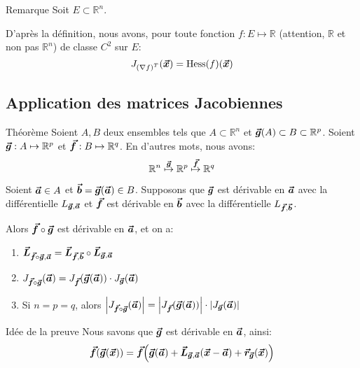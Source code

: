 \documentclass[a4paper]{article}
\begin{document}
\begin{parag}{Remarque}
    Soit $E \subset \mathbb{R}^n$.

    D'après la définition, nous avons, pour toute fonction $f: E \mapsto \mathbb{R}$ (attention, $\mathbb{R}$ et non pas $\mathbb{R}^n$) de classe $C^2$ sur $E$: 
    \[J_{\left(\nabla f\right)^T}\left(\bvec{x}\right) = \Hess\left(f\right)\left(\bvec{x}\right)\]
\end{parag}

\subsection{Application des matrices Jacobiennes}
\begin{parag}{Théorème}
    Soient $A, B$ deux ensembles tels que $A \subset \mathbb{R}^n$ et $\bvec{g}\left(A\right) \subset B \subset \mathbb{R}^p$. Soient $\bm{\protect\vec{g}}: A \mapsto \mathbb{R}^p$ et $\bm{\protect\vec{f}} : B \mapsto \mathbb{R}^q$. En d'autres mots, nous avons: 
    \[\mathbb{R}^n \overset{\text{$\bm{\protect\vec{g}}$}}{\mapsto} \mathbb{R}^p \overset{\text{$\bm{\protect\vec{f}}$}}{\mapsto} \mathbb{R}^q\]
    
    Soient $\bm{\protect\vec{a}} \in A$ et $\bvec{b} = \bvec{g}\left(\bvec{a}\right) \in B$. Supposons que $\bm{\protect\vec{g}}$ est dérivable en $\bm{\protect\vec{a}}$ avec la différentielle $L_{\bm{\protect\vec{g}}, \bm{\protect\vec{a}}}$ et $\bm{\protect\vec{f}}$ est dérivable en $\bm{\protect\vec{b}}$ avec la différentielle $L_{\bm{\protect\vec{f}}, \bm{\protect\vec{b}}}$.

    \vspace{1em}

    Alors $\bm{\protect\vec{f}} \circ \bm{\protect\vec{g}}$ est dérivable en $\bm{\protect\vec{a}}$, et on a:
    \begin{enumerate}
        \item $\displaystyle \bm{\protect\vec{L}}_{\bm{\protect\vec{f}} \circ \bm{\protect\vec{g}}, \bm{\protect\vec{a}}} = \bm{\protect\vec{L}}_{\bm{\protect\vec{f}}, \bm{\protect\vec{b}}} \circ \bm{\protect\vec{L}}_{\bm{\protect\vec{g}}, \bm{\protect\vec{a}}}$
        \item $\displaystyle J_{\bvec{f}\circ \bvec{g}}\left(\bvec{a}\right) = J_{\bvec{f}}\left(\bvec{g}\left(\bvec{a}\right)\right) \cdot J_{\bvec{g}}\left(\bvec{a}\right)$
        \item Si $n = p = q$, alors $\displaystyle \left|J_{\bvec{f} \circ \bvec{g}}\left(\bvec{a}\right)\right| = \left|J_{\bvec{f}}\left(\bvec{g}\left(\bvec{a}\right)\right)\right|\cdot \left|J_{\bvec{g}}\left(\bvec{a}\right)\right|$
    \end{enumerate}
    
    \begin{subparag}{Idée de la preuve}
        Nous savons que $\bm{\protect\vec{g}}$ est dérivable en $\bm{\protect\vec{a}}$, ainsi: 
        \[\bvec{f}\left(\bvec{g}\left(\bvec{x}\right)\right) = \bvec{f}\left(\bvec{g}\left(\bvec{a}\right) + \bvec{L}_{\bvec{g}, \bvec{a}}\left(\bvec{x} - \bvec{a}\right) + \bvec{r}_{\bvec{g}}\left(\bvec{x}\right)\right)\]
        

\end{subparag}
\end{parag}
\end{document}
